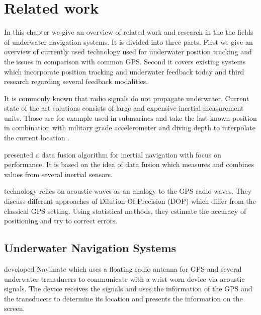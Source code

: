%

\chapter{Related work}
\label{relatedwork}

In this chapter we give an overview of related work and research in the the fields of underwater navigation systems. 
It is divided into three parts.
First we give an overview of currently used technology used for underwater position tracking and the issues in comparison with common GPS.
Second it covers existing systems which incorporate position tracking and underwater feedback today and third research regarding several feedback modalities. 

It is commonly known that radio signals do not propagate underwater.
Current state of the art solutions consists of large and expensive inertial measurement units. 
Those are for example used in submarines and take the last known position in combination with military grade accelerometer and diving depth to interpolate the current location \citep{meyer}.

\cite{Rossi_Performance} presented a data fusion algorithm for inertial navigation with focus on performance.
It is based on the idea of data fusion which measures and combines values from several inertial sensors.

\cite{Taraldsen_UnderwaterGPS} technology relies on acoustic waves as an analogy to the GPS radio waves.
They discuss different approaches of Dilution Of Precision (DOP) which differ from the classical GPS setting.
Using statistical methods, they estimate the accuracy of positioning and try to correct errors.


\section{Underwater Navigation Systems}

\cite{navimate} developed Navimate which uses a floating radio antenna for GPS and several underwater transducers to communicate with a wrist-worn device via acoustic signals. 
The device receives the signals and uses the information of the GPS and the transducers to determine its location and presents the information on the screen. 

